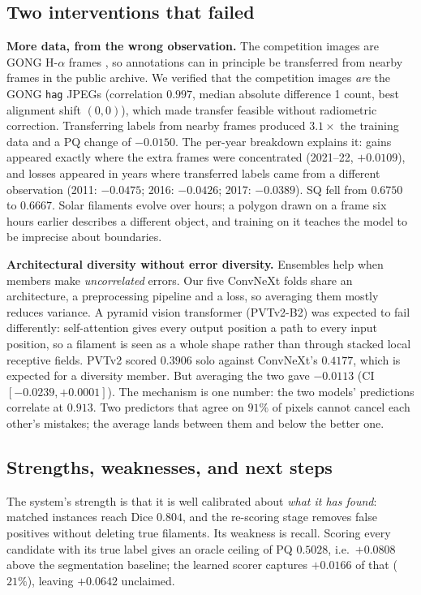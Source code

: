 \documentclass[sigconf]{acmart}
\begin{document}
\subsection{Two interventions that failed}
    \textbf{More data, from the wrong observation.} The competition images are GONG H-$\alpha$ frames \cite{gong}, so annotations can in principle be transferred from nearby frames in the public archive. We verified that the competition images \emph{are} the GONG \texttt{hag} JPEGs (correlation $0.997$, median absolute difference 1 count, best alignment shift $(0,0)$), which made transfer feasible without radiometric correction. Transferring labels from nearby frames produced $3.1\times$ the training data and a PQ change of $-0.0150$. The per-year breakdown explains it: gains appeared exactly where the extra frames were concentrated (2021--22, $+0.0109$), and losses appeared in years where transferred labels came from a different observation (2011: $-0.0475$; 2016: $-0.0426$; 2017: $-0.0389$). SQ fell from $0.6750$ to $0.6667$. Solar filaments evolve over hours; a polygon drawn on a frame six hours earlier describes a different object, and training on it teaches the model to be imprecise about boundaries.

    \textbf{Architectural diversity without error diversity.} Ensembles help when members make \emph{uncorrelated} errors. Our five ConvNeXt folds share an architecture, a preprocessing pipeline and a loss, so averaging them mostly reduces variance. A pyramid vision transformer (PVTv2-B2) was expected to fail differently: self-attention gives every output position a path to every input position, so a filament is seen as a whole shape rather than through stacked local receptive fields. PVTv2 scored $0.3906$ solo against ConvNeXt's $0.4177$, which is expected for a diversity member. But averaging the two gave $-0.0113$ (CI $[-0.0239, +0.0001]$). The mechanism is one number: the two models' predictions correlate at $\mathbf{0.913}$. Two predictors that agree on $91\%$ of pixels cannot cancel each other's mistakes; the average lands between them and below the better one.

\subsection{Strengths, weaknesses, and next steps}
    The system's strength is that it is well calibrated about \emph{what it has found}: matched instances reach Dice $0.804$, and the re-scoring stage removes false positives without deleting true filaments. Its weakness is recall. Scoring every candidate with its true label gives an oracle ceiling of PQ $0.5028$, i.e.\ $+0.0808$ above the segmentation baseline; the learned scorer captures $+0.0166$ of that ($21\%$), leaving $+0.0642$ unclaimed.
\end{document}
